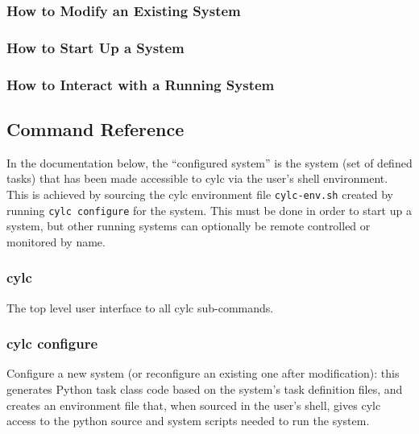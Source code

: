 \documentclass[11pt,a4paper]{article}
\begin{document}
\subsubsection{How to Modify an Existing System}

\subsubsection{How to Start Up a System}

\subsubsection{How to Interact with a Running System}


\pagebreak
\subsection{Command Reference}

\lstset{
language=,
xleftmargin=2em,
basicstyle=\tiny\ttfamily
}

In the documentation below, the ``configured system'' is the system
(set of defined tasks) that has been made accessible to cylc via the
user's shell environment. This is achieved by sourcing the cylc
environment file \verb=cylc-env.sh= created by running 
\verb=cylc configure= for the system. This must be done in order to
start up a system, but other running systems can optionally be remote
controlled or monitored by name.

\subsubsection{cylc}

The top level user interface to all cylc sub-commands.

{
\color{Magenta}

}


\pagebreak
\subsubsection{cylc configure}

Configure a new system (or reconfigure an existing one after 
modification): this generates Python task class code based on 
the system's task definition files, and creates an environment 
file that, when sourced in the user's shell, gives cylc access to the
python source and system scripts needed to run the system.
{
\color{Magenta}

}
\end{document}
